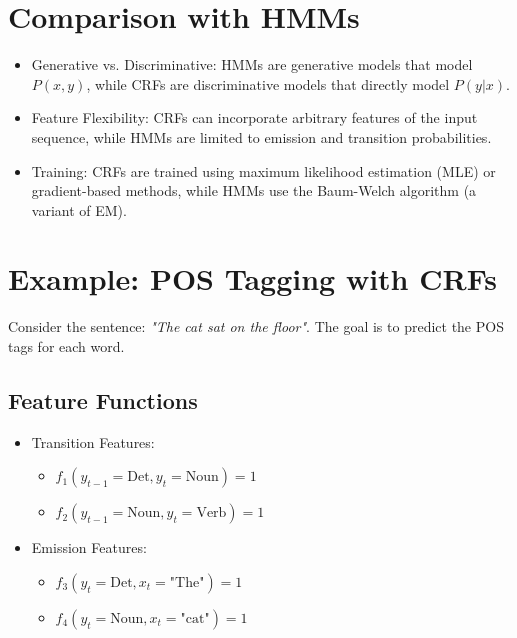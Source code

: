 \begin{notechapter}
\begin{center}
\end{center}

\section{Comparison with HMMs}
\begin{itemize}
    \item Generative vs. Discriminative: HMMs are 
          generative models that model \( P(x, y) \), 
          while CRFs are discriminative models that 
          directly model \( P(y | x) \).
    \item Feature Flexibility: CRFs can incorporate 
          arbitrary features of the input sequence, 
          while HMMs are limited to emission and 
          transition probabilities.
    \item Training: CRFs are trained using maximum 
          likelihood estimation (MLE) or gradient-based 
          methods, while HMMs use the Baum-Welch 
          algorithm (a variant of EM).
\end{itemize}

\section{Example: POS Tagging with CRFs}
Consider the sentence: \textit{"The cat sat on the floor"}. 
The goal is to predict the POS tags for each word.

\subsection{Feature Functions}
\begin{itemize}
    \item Transition Features:
        \begin{itemize}
            \item \( f_1(y_{t-1} = \text{Det}, y_t = \text{Noun}) = 1 \)
            \item \( f_2(y_{t-1} = \text{Noun}, y_t = \text{Verb}) = 1 \)
        \end{itemize}
    \item Emission Features:
        \begin{itemize}
            \item \( f_3(y_t = \text{Det}, x_t = \text{"The"}) = 1 \)
            \item \( f_4(y_t = \text{Noun}, x_t = \text{"cat"}) = 1 \)
        \end{itemize}
\end{itemize}


\end{notechapter}
